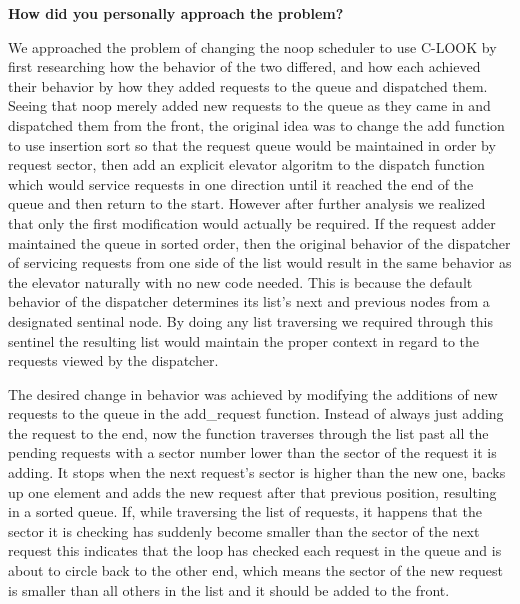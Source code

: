 \documentclass[10pt,letterpaper,draftclsnofoot,onecolumn]{IEEEtran}
\begin{document}
\bigskip

\noindent\textbf{How did you personally approach the problem?}
\medskip

\medskip

\noindent We approached the problem of changing the noop scheduler to use C-LOOK by first researching how the behavior of the two differed, and how each achieved their behavior by how they added requests to the queue and dispatched them. Seeing that noop merely added new requests to the queue as they came in and dispatched them from the front, the original idea was to change the add function to use insertion sort so that the request queue would be maintained in order by request sector, then add an explicit elevator algoritm to the dispatch function which would service requests in one direction until it reached the end of the queue and then return to the start. However after further analysis we realized that only the first modification would actually be required. If the request adder maintained the queue in sorted order, then the original behavior of the dispatcher of servicing requests from one side of the list would result in the same behavior as the elevator naturally with no new code needed. This is because the default behavior of the dispatcher determines its list's next and previous nodes from a designated sentinal node. By doing any list traversing we required through this sentinel the resulting list would maintain the proper context in regard to the requests viewed by the dispatcher.\par
\medskip

\medskip

\noindent The desired change in behavior was achieved by modifying the additions of new requests to the queue in the add\_request function. Instead of always just adding the request to the end, now the function traverses through the list past all the pending requests with a sector number lower than the sector of the request it is adding. It stops when the next request's sector is higher than the new one, backs up one element and adds the new request after that previous position, resulting in a sorted queue. If, while traversing the list of requests, it happens that the sector it is checking has suddenly become smaller than the sector of the next request this indicates that the loop has checked each request in the queue and is about to circle back to the other end, which means the sector of the new request is smaller than all others in the list and it should be added to the front.\par
\end{document}

